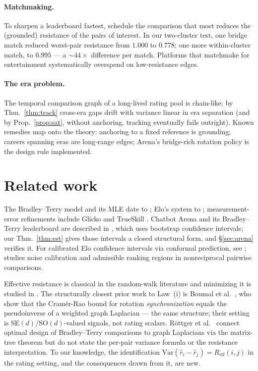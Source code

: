 \documentclass[11pt]{article}
\newcommand{\Reff}{R_{\mathrm{eff}}}
\newcommand{\Var}{\mathrm{Var}}
\begin{document}
\paragraph{Matchmaking.} To sharpen a leaderboard fastest, schedule the
comparison that most reduces the (grounded) resistance of the pairs of
interest. In our two-cluster test, one bridge match reduced worst-pair
resistance from $1.000$ to $0.778$; one more within-cluster match, to
$0.995$ --- a ${\sim}44\times$ difference per match. Platforms that
matchmake for entertainment systematically overspend on low-resistance
edges.

\paragraph{The era problem.} The temporal comparison graph of a
long-lived rating pool is chain-like; by Thm.~\ref{thm:track} cross-era
gaps drift with variance linear in era separation (and by
Prop.~\ref{prop:sat}, without anchoring, tracking eventually fails
outright). Known remedies map onto the theory: anchoring to a fixed
reference is grounding; careers spanning eras are long-range edges;
Arena's bridge-rich rotation policy is the design rule implemented.

\section{Related work}\label{sec:related}

The Bradley--Terry model and its MLE date to \cite{zermelo1929,
bradleyterry1952}; Elo's system to \cite{elo1978}; measurement-error
refinements include Glicko \cite{glickman1999} and TrueSkill
\cite{trueskill2006}. Chatbot Arena and its Bradley--Terry leaderboard
are described in \cite{chiang2024}, which uses bootstrap confidence
intervals; our Thm.~\ref{thm:est} gives those intervals a closed
structural form, and \S\ref{sec:arena} verifies it. For calibrated Elo
confidence intervals via conformal prediction, see \cite{kargi2026};
\cite{magnot2026} studies noise calibration and admissible ranking
regions in nonreciprocal pairwise comparisons.

Effective resistance is classical in the random-walk literature
\cite{doylesnell1984} and minimizing it is studied in
\cite{ghoshboydsaberi2008}. The structurally closest prior work to
Law~(i) is Boumal et al.\ \cite{boumal2014}, who show that the
Cram\'er-Rao bound for rotation \emph{synchronization} equals the
pseudoinverse of a weighted graph Laplacian --- the same structure; their
setting is SE$(d)$/SO$(d)$-valued signals, not rating scalars.
R\"ottger et al.\ \cite{rottger2022} connect optimal design of
Bradley--Terry comparisons to graph Laplacians via the matrix-tree
theorem but do not state the per-pair variance formula or the resistance
interpretation. To our knowledge, the identification
$\Var(\hat r_i - \hat r_j) = \Reff(i,j)$ in the rating setting, and the
consequences drawn from it, are new.
\end{document}
